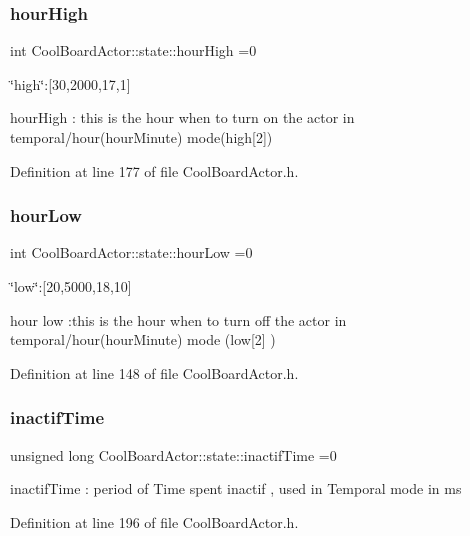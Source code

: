 \subsubsection{\texorpdfstring{hour\+High}{hourHigh}}
{\footnotesize\ttfamily int Cool\+Board\+Actor\+::state\+::hour\+High =0}

\char`\"{}high\char`\"{}\+:\mbox{[}30,2000,17,1\mbox{]}

hour\+High \+: this is the hour when to turn on the actor in temporal/hour(hour\+Minute) mode(high\mbox{[}2\mbox{]}) 

Definition at line 177 of file Cool\+Board\+Actor.\+h.

\mbox{\label{struct_cool_board_actor_1_1state_ae7034bf95b36f1392f9de076fa0c8c0f}} 
\subsubsection{\texorpdfstring{hour\+Low}{hourLow}}
{\footnotesize\ttfamily int Cool\+Board\+Actor\+::state\+::hour\+Low =0}

\char`\"{}low\char`\"{}\+:\mbox{[}20,5000,18,10\mbox{]}

hour low \+:this is the hour when to turn off the actor in temporal/hour(hour\+Minute) mode (low\mbox{[}2\mbox{]} ) 

Definition at line 148 of file Cool\+Board\+Actor.\+h.

\mbox{\label{struct_cool_board_actor_1_1state_a6d88835f4402b3b81cd404784281854b}} 
\subsubsection{\texorpdfstring{inactif\+Time}{inactifTime}}
{\footnotesize\ttfamily unsigned long Cool\+Board\+Actor\+::state\+::inactif\+Time =0}

inactif\+Time \+: period of Time spent inactif , used in Temporal mode in ms 

Definition at line 196 of file Cool\+Board\+Actor.\+h.

